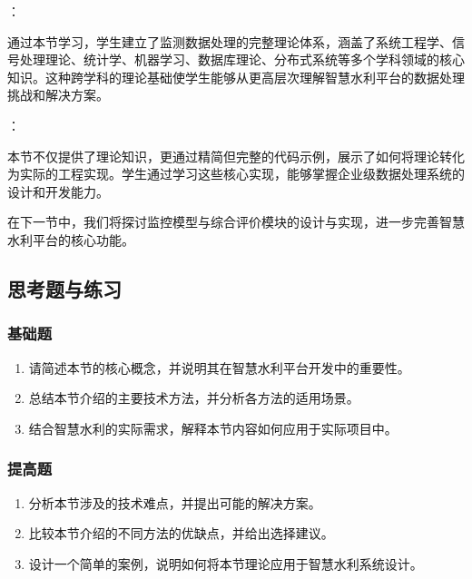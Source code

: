：

通过本节学习，学生建立了监测数据处理的完整理论体系，涵盖了系统工程学、信号处理理论、统计学、机器学习、数据库理论、分布式系统等多个学科领域的核心知识。这种跨学科的理论基础使学生能够从更高层次理解智慧水利平台的数据处理挑战和解决方案。

：

本节不仅提供了理论知识，更通过精简但完整的代码示例，展示了如何将理论转化为实际的工程实现。学生通过学习这些核心实现，能够掌握企业级数据处理系统的设计和开发能力。

在下一节中，我们将探讨监控模型与综合评价模块的设计与实现，进一步完善智慧水利平台的核心功能。

\hypertarget{ux601dux8003ux9898ux4e0eux7ec3ux4e60-1}{%
\subsection{思考题与练习}\label{ux601dux8003ux9898ux4e0eux7ec3ux4e60-1}}

\hypertarget{ux57faux7840ux9898-1}{%
\subsubsection{基础题}\label{ux57faux7840ux9898-1}}

\begin{enumerate}
\def\labelenumi{\arabic{enumi}.}
\tightlist
\item
  请简述本节的核心概念，并说明其在智慧水利平台开发中的重要性。
\item
  总结本节介绍的主要技术方法，并分析各方法的适用场景。
\item
  结合智慧水利的实际需求，解释本节内容如何应用于实际项目中。
\end{enumerate}

\hypertarget{ux63d0ux9ad8ux9898-1}{%
\subsubsection{提高题}\label{ux63d0ux9ad8ux9898-1}}

\begin{enumerate}
\def\labelenumi{\arabic{enumi}.}
\tightlist
\item
  分析本节涉及的技术难点，并提出可能的解决方案。
\item
  比较本节介绍的不同方法的优缺点，并给出选择建议。
\item
  设计一个简单的案例，说明如何将本节理论应用于智慧水利系统设计。
\end{enumerate}


